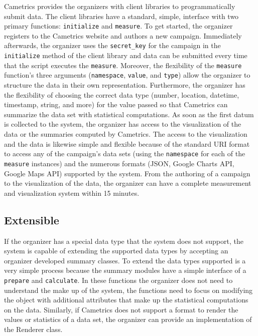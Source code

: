 \documentclass[10pt,a4paper,english]{article}
\begin{document}
Cametrics provides the organizers with client libraries to programmatically submit data. The client libraries have a standard, simple, interface with two primary functions: \texttt{initialize} and \texttt{measure}. To get started, the organizer registers to the Cametrics website and authors a new campaign. Immediately afterwards, the organizer uses the \texttt{secret{\_}key} for the campaign in the \texttt{initialize} method of the client library and data can be submitted every time that the script executes the \texttt{measure}. Moreover, the flexibility of the \texttt{measure} function's three arguments (\texttt{namespace}, \texttt{value}, and \texttt{type}) allow the organizer to structure the data in their own representation. Furthermore, the organizer has the flexibility of choosing the correct data type (number, location, datetime, timestamp, string, and more) for the value passed so that Cametrics can summarize the data set with statistical computations. As soon as the first datum is collected to the system, the organizer has access to the visualization of the data or the summaries computed by Cametrics. The access to the visualization and the data is likewise simple and flexible because of the standard URI format to access any of the campaign's data sets (using the \texttt{namespace} for each of the \texttt{measure} instances) and the numerous formats (JSON, Google Charts API, Google Maps API) supported by the system. From the authoring of a campaign to the visualization of the data, the organizer can have a complete measurement and visualization system within 15 minutes.



\hypertarget{extensible}{}
\subsection*{Extensible}
\label{extensible}

If the organizer has a special data type that the system does not support, the system is capable of extending the supported data types by accepting an organizer developed summary classes. To extend the data types supported is a very simple process because the summary modules have a simple interface of a \texttt{prepare} and \texttt{calculate}. In these functions the organizer does not need to understand the make up of the system, the functions need to focus on modifying the object with additional attributes that make up the statistical computations on the data. Similarly, if Cametrics does not support a format to render the values or statistics of a data set, the organizer can provide an implementation of the Renderer class.
\end{document}

